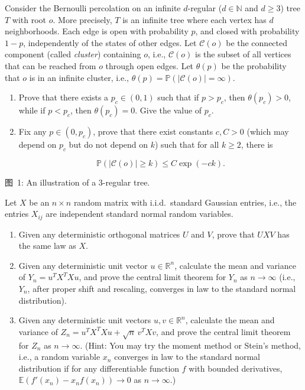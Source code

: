 \documentclass[11pt,a4paper]{article}
\newcommand{\examstatement}[1]{%
  \par\addvspace{0.85em}%
  \noindent{\bfseries #1}\par\nobreak\addvspace{0.28em}%
}
\begin{document}
\examstatement{Problem 5. [15 pts.]}
Consider the Bernoulli percolation on an infinite \( d \)-regular (\( d \in \mathbb{N} \) and \( d \ge 3 \)) tree \( T \) with root \( o \). More precisely, \( T \) is an infinite tree where each vertex has \( d \) neighborhoods. Each edge is open with probability \( p \), and closed with probability \( 1 - p \), independently of the states of other edges. Let \( \mathcal{C}(o) \) be the connected component (called \emph{cluster}) containing \( o \), i.e., \( \mathcal{C}(o) \) is the subset of all vertices that can be reached from \( o \) through open edges. Let \( \theta(p) \) be the probability that \( o \) is in an infinite cluster, i.e., \( \theta(p) = \mathbb{P}(|\mathcal{C}(o)| = \infty) \).
\begin{enumerate}[label=(\alph*)]
    \item Prove that there exists a \( p_c \in (0, 1) \) such that if \( p > p_c \), then \( \theta(p_c) > 0 \), while if \( p < p_c \), then \( \theta(p_c) = 0 \). Give the value of \( p_c \).
    \item Fix any \( p \in (0, p_c) \), prove that there exist constants \( c, C > 0 \) (which may depend on \( p_c \) but do not depend on \( k \)) such that for all \( k \ge 2 \), there is

    \[
    \mathbb{P}(|\mathcal{C}(o)| \ge k) \le C \exp(-ck).
    \]
\end{enumerate}

\begin{center}
\small
图~1: An illustration of a 3-regular tree.
\end{center}

\examstatement{Problem 6. [15 pts.]}
Let \( X \) be an \( n \times n \) random matrix with i.i.d.\ standard Gaussian entries, i.e., the entries \( X_{ij} \) are independent standard normal random variables.
\begin{enumerate}[label=(\alph*)]
    \item Given any deterministic orthogonal matrices \( U \) and \( V \), prove that \( UXV \) has the same law as \( X \).
    \item Given any deterministic unit vector \( u \in \mathbb{R}^n \), calculate the mean and variance of \( Y_n = u^T X^T X u \), and prove the central limit theorem for \( Y_n \) as \( n \to \infty \) (i.e., \( Y_n \), after proper shift and rescaling, converges in law to the standard normal distribution).
    \item Given any deterministic unit vectors \( u, v \in \mathbb{R}^n \), calculate the mean and variance of \( Z_n = u^T X^T X u + \sqrt{n}\, v^T X v \), and prove the central limit theorem for \( Z_n \) as \( n \to \infty \). (Hint: You may try the moment method or Stein's method, i.e., a random variable \( x_n \) converges in law to the standard normal distribution if for any differentiable function \( f \) with bounded derivatives, \( \mathbb{E}(f'(x_n) - x_n f(x_n)) \to 0 \) as \( n \to \infty \).)
\end{enumerate}
\end{document}
